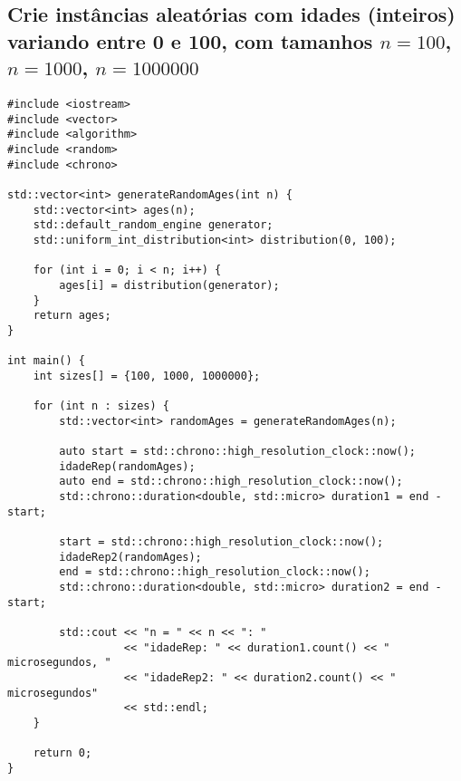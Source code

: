 \subsection{Crie instâncias aleatórias com idades (inteiros) variando entre 0 e 100, com tamanhos \( n = 100 \), \( n = 1000 \), \( n = 1000000 \)}

\begin{verbatim}
#include <iostream>
#include <vector>
#include <algorithm>
#include <random>
#include <chrono>

std::vector<int> generateRandomAges(int n) {
    std::vector<int> ages(n);
    std::default_random_engine generator;
    std::uniform_int_distribution<int> distribution(0, 100);

    for (int i = 0; i < n; i++) {
        ages[i] = distribution(generator);
    }
    return ages;
}

int main() {
    int sizes[] = {100, 1000, 1000000};

    for (int n : sizes) {
        std::vector<int> randomAges = generateRandomAges(n);
        
        auto start = std::chrono::high_resolution_clock::now();
        idadeRep(randomAges);
        auto end = std::chrono::high_resolution_clock::now();
        std::chrono::duration<double, std::micro> duration1 = end - start;

        start = std::chrono::high_resolution_clock::now();
        idadeRep2(randomAges);
        end = std::chrono::high_resolution_clock::now();
        std::chrono::duration<double, std::micro> duration2 = end - start;

        std::cout << "n = " << n << ": "
                  << "idadeRep: " << duration1.count() << " microsegundos, "
                  << "idadeRep2: " << duration2.count() << " microsegundos" 
                  << std::endl;
    }

    return 0;
}

\end{verbatim}
